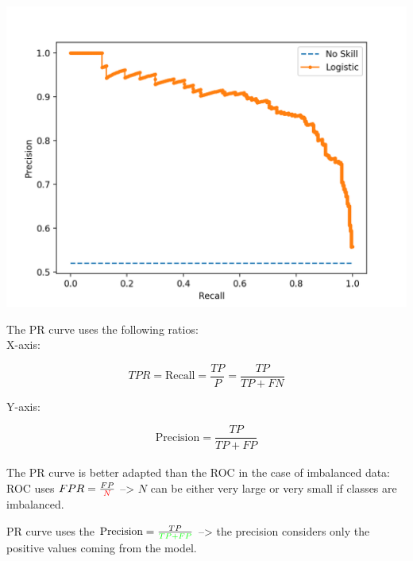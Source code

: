 \includegraphics[scale=0.5]{PR_curve.png}

The PR curve uses the following ratios: \\

X-axis:

$$TPR = \text{Recall} = \frac{TP}{P} = \frac{TP}{TP + FN}$$

Y-axis:

$$\text{Precision} = \frac{TP}{TP + FP}$$ \\

The PR curve is better adapted than the ROC in the case of imbalanced data: \\

ROC uses $FPR = \frac{FP}{\textcolor{red}{N}} $ --> $N$ can be either very large or very small if classes are imbalanced.

PR curve uses the $\text{Precision} = \frac{TP}{\textcolor{green}{TP + FP}}$ --> the precision considers only the positive values coming from the model.



\vspace{5mm}
